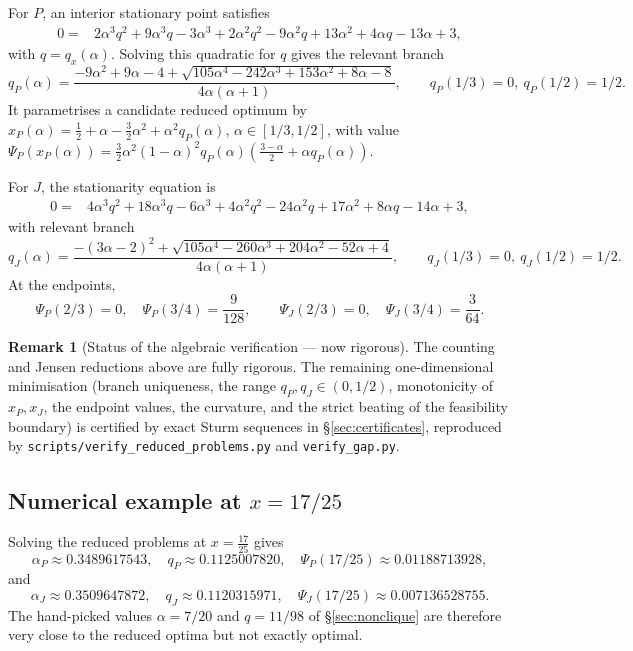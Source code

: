 \documentclass[11pt]{amsart}
\theoremstyle{definition}
\newtheorem{remark}[theorem]{Remark}
\newcommand{\1}{\mathbf 1}
\begin{document}
For $P$, an interior stationary point satisfies
\[
\begin{split}
0={}&2\alpha^3q^2+9\alpha^3q-3\alpha^3
+2\alpha^2q^2-9\alpha^2q+13\alpha^2
+4\alpha q-13\alpha+3,
\end{split}
\]
with $q=q_x(\alpha)$.  Solving this quadratic for $q$ gives the relevant branch
\[
   q_P(\alpha)=
   \frac{-9\alpha^2+9\alpha-4+
   \sqrt{105\alpha^4-242\alpha^3+153\alpha^2+8\alpha-8}}
   {4\alpha(\alpha+1)},
   \qquad
   q_P(1/3)=0,\ q_P(1/2)=1/2.
\]
It parametrises a candidate reduced optimum by
$x_P(\alpha)=\frac12+\alpha-\frac32\alpha^2+\alpha^2q_P(\alpha)$,
$\alpha\in[1/3,1/2]$, with value
$\Psi_P(x_P(\alpha))=\frac32\alpha^2(1-\alpha)^2q_P(\alpha)
\left(\frac{3-\alpha}{2}+\alpha q_P(\alpha)\right)$.

For $J$, the stationarity equation is
\[
\begin{split}
0={}&4\alpha^3q^2+18\alpha^3q-6\alpha^3
+4\alpha^2q^2-24\alpha^2q+17\alpha^2
+8\alpha q-14\alpha+3,
\end{split}
\]
with relevant branch
\[
   q_J(\alpha)=
   \frac{-(3\alpha-2)^2+
   \sqrt{105\alpha^4-260\alpha^3+204\alpha^2-52\alpha+4}}
   {4\alpha(\alpha+1)},
   \qquad
   q_J(1/3)=0,\ q_J(1/2)=1/2.
\]
At the endpoints,
\[
   \Psi_P(2/3)=0,\quad \Psi_P(3/4)=\frac9{128},
   \qquad
   \Psi_J(2/3)=0,\quad \Psi_J(3/4)=\frac3{64}.
\]

\begin{remark}[Status of the algebraic verification --- now rigorous]
The counting and Jensen reductions above are fully rigorous.  The remaining
one-dimensional minimisation (branch uniqueness, the range
$q_P,q_J\in(0,1/2)$, monotonicity of $x_P,x_J$, the endpoint values, the
curvature, and the strict beating of the feasibility boundary) is certified by
exact Sturm sequences in \S\ref{sec:certificates}, reproduced by
\texttt{scripts/verify\_reduced\_problems.py} and \texttt{verify\_gap.py}.
\end{remark}

\subsection{Numerical example at $x=17/25$}

Solving the reduced problems at $x=\frac{17}{25}$ gives
\[
   \alpha_P\approx 0.3489617543,\quad q_P\approx 0.1125007820,\quad
   \Psi_P(17/25)\approx 0.01188713928,
\]
and
\[
   \alpha_J\approx 0.3509647872,\quad q_J\approx 0.1120315971,\quad
   \Psi_J(17/25)\approx 0.007136528755.
\]
The hand-picked values $\alpha=7/20$ and $q=11/98$ of \S\ref{sec:nonclique} are
therefore very close to the reduced optima but not exactly optimal.
\end{document}
